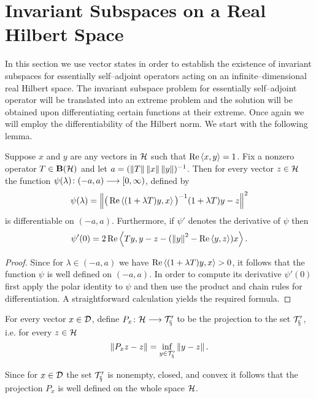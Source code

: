 \goodbreak
\section{Invariant Subspaces on a Real Hilbert Space}

In this section we use vector states in order to establish the
existence of invariant subspaces for essentially self--adjoint
operators acting on an infinite--dimensional real Hilbert
space. The invariant subspace problem for essentially
self--adjoint operator will be translated into an extreme
problem and the solution will be obtained upon differentiating
certain functions at their extreme. Once again we will employ
the differentiability of the Hilbert norm. We start with the
following lemma.

\begin{lem}\label{l:DIFF}
Suppose $x$ and $y$ are any vectors in ${\cal H}$ such that
$\operatorname{Re}\left<x,y\right>=1$. Fix a nonzero operator $T\in\mathbf B(\cal H)$ and let
$a=(\left\Vert T\right\Vert\left\Vert x\right\Vert\left\Vert y\right\Vert)^{-1}$. Then for every vector
$z\in{\cal H}$ the function $\psi(\lambda)\colon(-a,a)\longrightarrow[0,\infty)$,
defined by
\[ \psi(\lambda) = \left\Vert
   \big(\operatorname{Re}\left<(1+\lambda T)y, x\right>\big)^{-1} (1+\lambda T)y - z\right\Vert^2 \]
is differentiable on $(-a,a)$. Furthermore, if $\psi'$ denotes
the derivative of $\psi$ then
\[ \psi'(0) = 2\operatorname{Re}\left<T y, y - z - (\left\Vert y\right\Vert^2-\operatorname{Re}\left<y,z\right>) x\right>. \]
\end{lem}

\begin{proof}
Since for $\lambda\in(-a,a)$ we have $\operatorname{Re}\left<(1+\lambda T)y,
x\right>>0$, it follows that the function $\psi$ is well defined on
$(-a,a)$. In order to compute its derivative $\psi'(0)$ first
apply the polar identity to $\psi$ and then use the product and
chain rules for differentiation. A straightforward calculation
yields the required formula.
\end{proof}

\begin{defn}
For every vector $x\in{\cal{D}}$, define $P_x\colon{\cal H}\longrightarrow\cal{T}'_x$
to be the projection to the set $\cal{T}'_x$, \,\,i.e. for
every $z\in{\cal H}$
\[ \left\Vert P_x z - z\right\Vert = \inf_{y\in\cal{T}'_x} \left\Vert y-z\right\Vert. \]
\end{defn}

\begin{rem}
Since for $x\in{\cal{D}}$ the set $\cal{T}'_x$ is nonempty, closed,
and convex it follows that the projection $P_x$ is well defined
on the whole space ${\cal H}$.
\end{rem}

